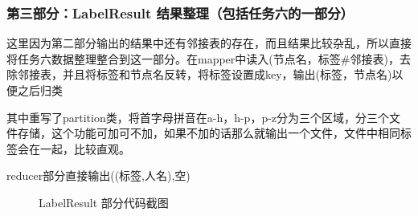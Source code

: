 \documentclass[a4paper,UTF8]{article}
\numberwithin{equation}{section}
\begin{document}
\subsubsection{第三部分：LabelResult 结果整理（包括任务六的一部分）}
\par 这里因为第二部分输出的结果中还有邻接表的存在，而且结果比较杂乱，所以直接将任务六数据整理整合到这一部分。在mapper中读入(节点名，标签\#邻接表)，去除邻接表，并且将标签和节点名反转，将标签设置成key，输出(标签，节点名)以便之后归类
\par 其中重写了partition类，将首字母拼音在a-h，h-p，p-z分为三个区域，分三个文件存储，这个功能可加可不加，如果不加的话那么就输出一个文件，文件中相同标签会在一起，比较直观。
\par reducer部分直接输出((标签,人名),空)
\begin{figure}[H]
    \centering
	\vfill
	\vfill
	
	\caption{LabelResult 部分代码截图}
\end{figure}
\end{document}
